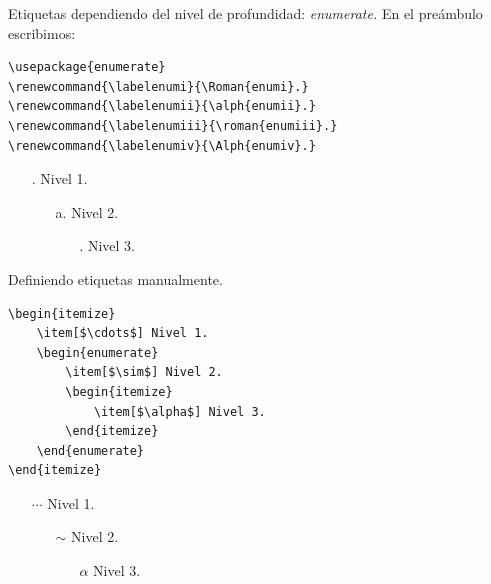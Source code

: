 \documentclass[dvipsnames,xcolor, handout]{beamer}
\newcommand*{\rom}[1]{\expandafter\romannumeral #1}
\newcommand{\Rom}[1]{\uppercase\expandafter{\romannumeral #1\relax}}
\theoremstyle{plain}
\theoremstyle{definition}
\begin{document}
\begin{frame}[fragile]{Etiquetas dependiendo del nivel de profundidad: \itshape enumerate.}
En el preámbulo escribimos:
\begin{verbatim}
\usepackage{enumerate}
\renewcommand{\labelenumi}{\Roman{enumi}.}
\renewcommand{\labelenumii}{\alph{enumii}.}
\renewcommand{\labelenumiii}{\roman{enumiii}.}    
\renewcommand{\labelenumiv}{\Alph{enumiv}.}
\end{verbatim}

\begin{enumerate}
    \item[\Rom{1}.] Nivel 1.
    \begin{enumerate}
        \item[a.] Nivel 2.
        \begin{enumerate}
            \item[\rom{1}.] Nivel 3.
        \end{enumerate}
    \end{enumerate}
\end{enumerate}
\end{frame}

\begin{frame}[fragile]{Definiendo etiquetas manualmente.}
\begin{verbatim}
\begin{itemize}
    \item[$\cdots$] Nivel 1.
    \begin{enumerate}
        \item[$\sim$] Nivel 2.
        \begin{itemize}
            \item[$\alpha$] Nivel 3.
        \end{itemize}
    \end{enumerate}
\end{itemize}   
\end{verbatim}

\begin{itemize}
    \item[$\cdots$] Nivel 1.
    \begin{enumerate}
        \item[$\sim$] Nivel 2.
        \begin{itemize}
            \item[$\alpha$] Nivel 3.
        \end{itemize}
    \end{enumerate}
\end{itemize}   
\end{frame}
\end{document}
